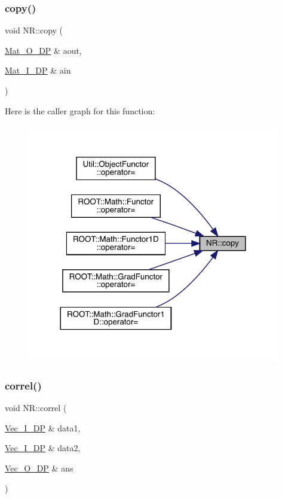 \mbox{\label{namespaceNR_a33f0ee887bd75c78a6b2f97a825f5be1}} 
\subsubsection{\texorpdfstring{copy()}{copy()}}
{\footnotesize\ttfamily void N\+R\+::copy (\begin{DoxyParamCaption}\item[{\mbox{\hyperlink{namespaceNR_adc1f8da33094b6bbeb1f5f899515ce54}{Mat\+\_\+\+O\+\_\+\+DP}} \&}]{aout,  }\item[{\mbox{\hyperlink{namespaceNR_a2b8abfda8fffad6ba0a1b5a4c0773dbf}{Mat\+\_\+\+I\+\_\+\+DP}} \&}]{ain }\end{DoxyParamCaption})}

Here is the caller graph for this function\+:\nopagebreak
\begin{figure}[H]
\begin{center}
\leavevmode
\includegraphics[width=312pt]{da/d46/namespaceNR_a33f0ee887bd75c78a6b2f97a825f5be1_icgraph}
\end{center}
\end{figure}
\mbox{\label{namespaceNR_a38e1298c084b073e4e7465dbd62ad7fb}} 
\subsubsection{\texorpdfstring{correl()}{correl()}}
{\footnotesize\ttfamily void N\+R\+::correl (\begin{DoxyParamCaption}\item[{\mbox{\hyperlink{namespaceNR_a9f943da53862537c552e2a770cb170ae}{Vec\+\_\+\+I\+\_\+\+DP}} \&}]{data1,  }\item[{\mbox{\hyperlink{namespaceNR_a9f943da53862537c552e2a770cb170ae}{Vec\+\_\+\+I\+\_\+\+DP}} \&}]{data2,  }\item[{\mbox{\hyperlink{namespaceNR_a970094d23441f8ef6a45282a7eb2103d}{Vec\+\_\+\+O\+\_\+\+DP}} \&}]{ans }\end{DoxyParamCaption})}

